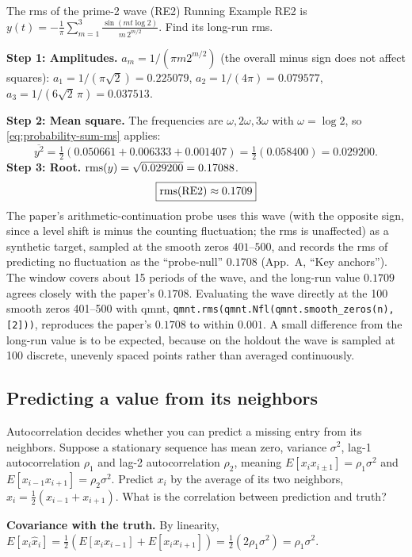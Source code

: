 \begin{sample}{The rms of the prime-2 wave (RE2)}
Running Example RE2 is $y(t)=-\frac1\pi\sum_{m=1}^{3}\frac{\sin(mt\log2)}{m\,2^{m/2}}$. Find its long-run rms.

\textbf{Step 1: Amplitudes.} $a_m=1/(\pi m 2^{m/2})$ (the overall minus sign does not affect squares):
$a_1=1/(\pi\sqrt2)=0.225079$, $a_2=1/(4\pi)=0.079577$, $a_3=1/(6\sqrt2\,\pi)=0.037513$.

\textbf{Step 2: Mean square.} The frequencies are $\omega,2\omega,3\omega$ with $\omega=\log 2$, so \cref{eq:probability-sum-ms} applies:
\[
\overline{y^2}=\tfrac12(0.050661+0.006333+0.001407)=\tfrac12(0.058400)=0.029200 .
\]
\textbf{Step 3: Root.} $\mathrm{rms}(y)=\sqrt{0.029200}=0.17088$.
\[
\boxed{\mathrm{rms}(\text{RE2})\approx0.1709}
\]
The paper's arithmetic-continuation probe uses this wave (with the opposite sign, since a level shift is minus the counting fluctuation; the rms is unaffected) as a synthetic target, sampled at the smooth zeros $401$--$500$, and records the rms of predicting no fluctuation as the ``probe-null'' $0.1708$ (App.~A, ``Key anchors''). The window covers about 15 periods of the wave, and the long-run value $0.1709$ agrees closely with the paper's $0.1708$. Evaluating the wave directly at the 100 smooth zeros 401--500 with qmnt, \texttt{qmnt.rms(qmnt.Nfl(qmnt.smooth\_zeros(n), [2]))}, reproduces the paper's $0.1708$ to within $0.001$. A small difference from the long-run value is to be expected, because on the holdout the wave is sampled at 100 discrete, unevenly spaced points rather than averaged continuously.
\end{sample}

\subsection{Predicting a value from its neighbors}

Autocorrelation decides whether you can predict a missing entry from its neighbors. Suppose a stationary sequence has mean zero, variance $\sigma^2$, lag-1 autocorrelation $\rho_1$ and lag-2 autocorrelation $\rho_2$, meaning $E[x_ix_{i\pm1}]=\rho_1\sigma^2$ and $E[x_{i-1}x_{i+1}]=\rho_2\sigma^2$. Predict $x_i$ by the average of its two neighbors, $\hat x_i=\tfrac12(x_{i-1}+x_{i+1})$. What is the correlation between prediction and truth?

\textbf{Covariance with the truth.} By linearity, $E[x_i\hat x_i]=\tfrac12(E[x_ix_{i-1}]+E[x_ix_{i+1}])=\tfrac12(2\rho_1\sigma^2)=\rho_1\sigma^2$.

